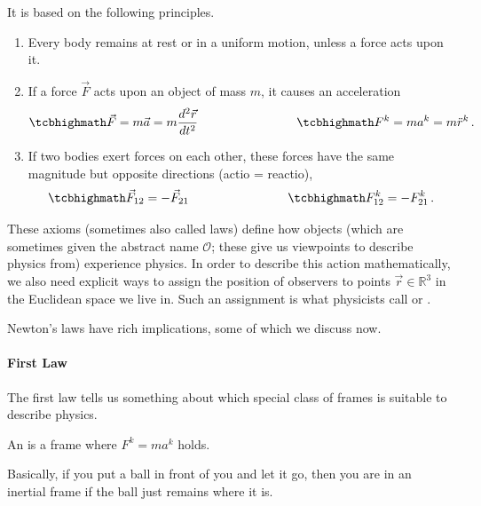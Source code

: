 \documentclass[../relativity_main.tex]{subfiles}
\begin{document}
It is based on the following principles.
\begin{post}
	\begin{enumerate}[1.]
		\item Every body remains at rest or in a uniform motion, unless a force acts upon it.

		\item If a force $\vec{F}$ acts upon an object of mass $m$, it causes an acceleration
		\begin{equation}\label{eq:newton_second_law}
			\eqbox{
			\vec{F} = m \vec{a} = m \dv[2]{\vec{r}}{t}
			}
			\manyqquad
			\eqbox{
			F^k = m a^k = m \ddot{r}^k
			} \, .
		\end{equation}

		\item If two bodies exert forces on each other, these forces have the same magnitude but opposite directions (actio = reactio),
		\begin{equation}\label{eq:newton_third_law}
			\eqbox{
			\vec{F}_{12} = - \vec{F}_{21}
			}
			\manyqquad
			\eqbox{
			F_{12}^k = - F_{21}^k
			} \, .
		\end{equation}
	\end{enumerate}
\end{post}
These axioms (sometimes also called laws) define how objects (which are sometimes given the abstract name  $\mathcal{O}$; these give us viewpoints to describe physics from) experience physics. In order to describe this action mathematically, we also need explicit ways to assign the position of observers to points $\vec{r} \in \mathbb{R}^3$ in the Euclidean space we live in. Such an assignment is what physicists call  or .


Newton's laws have rich implications, some of which we discuss now.



			\paragraph{First Law}
The first law tells us something about which special class of frames is suitable to describe physics.
\begin{defi}
	An  is a frame where $F^k = m a^k$ holds.
\end{defi}
Basically, if you put a ball in front of you and let it go, then you are in an inertial frame if the ball just remains where it is.
\end{document}
